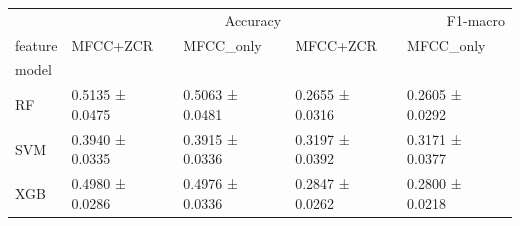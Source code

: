 \begin{tabular}{lllll}
\toprule
 & \multicolumn{2}{r}{Accuracy} & \multicolumn{2}{r}{F1-macro} \\
feature & MFCC+ZCR & MFCC_only & MFCC+ZCR & MFCC_only \\
model &  &  &  &  \\
\midrule
RF & 0.5135 ± 0.0475 & 0.5063 ± 0.0481 & 0.2655 ± 0.0316 & 0.2605 ± 0.0292 \\
SVM & 0.3940 ± 0.0335 & 0.3915 ± 0.0336 & 0.3197 ± 0.0392 & 0.3171 ± 0.0377 \\
XGB & 0.4980 ± 0.0286 & 0.4976 ± 0.0336 & 0.2847 ± 0.0262 & 0.2800 ± 0.0218 \\
\bottomrule
\end{tabular}
